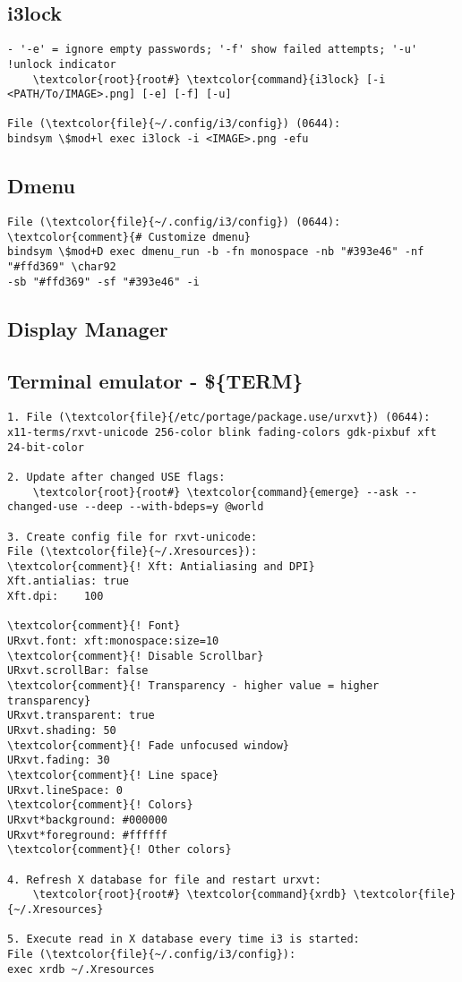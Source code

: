 \documentclass[10pt, a4paper, onecolumn, openany]{book}         %
\begin{document}
\subsection{i3lock}
\begin{Verbatim}[commandchars=\\\{\}]
- '-e' = ignore empty passwords; '-f' show failed attempts; '-u' !unlock indicator
    \textcolor{root}{root#} \textcolor{command}{i3lock} [-i <PATH/To/IMAGE>.png] [-e] [-f] [-u]
    
File (\textcolor{file}{~/.config/i3/config}) (0644):
bindsym \$mod+l exec i3lock -i <IMAGE>.png -efu
\end{Verbatim}



\subsection{Dmenu}
\begin{Verbatim}[commandchars=\\\{\}]
File (\textcolor{file}{~/.config/i3/config}) (0644):
\textcolor{comment}{# Customize dmenu}
bindsym \$mod+D exec dmenu_run -b -fn monospace -nb "#393e46" -nf "#ffd369" \char92
-sb "#ffd369" -sf "#393e46" -i
\end{Verbatim}
\subsection{Display Manager}


\subsection{Terminal emulator - \$\{TERM\}}
\begin{Verbatim}[commandchars=\\\{\}]
1. File (\textcolor{file}{/etc/portage/package.use/urxvt}) (0644):
x11-terms/rxvt-unicode 256-color blink fading-colors gdk-pixbuf xft 24-bit-color

2. Update after changed USE flags:
    \textcolor{root}{root#} \textcolor{command}{emerge} --ask --changed-use --deep --with-bdeps=y @world

3. Create config file for rxvt-unicode:
File (\textcolor{file}{~/.Xresources}):
\textcolor{comment}{! Xft: Antialiasing and DPI}
Xft.antialias: true
Xft.dpi:    100

\textcolor{comment}{! Font}
URxvt.font: xft:monospace:size=10
\textcolor{comment}{! Disable Scrollbar}
URxvt.scrollBar: false
\textcolor{comment}{! Transparency - higher value = higher transparency}
URxvt.transparent: true
URxvt.shading: 50
\textcolor{comment}{! Fade unfocused window}
URxvt.fading: 30
\textcolor{comment}{! Line space}
URxvt.lineSpace: 0
\textcolor{comment}{! Colors}
URxvt*background: #000000
URxvt*foreground: #ffffff
\textcolor{comment}{! Other colors}

4. Refresh X database for file and restart urxvt:
    \textcolor{root}{root#} \textcolor{command}{xrdb} \textcolor{file}{~/.Xresources}
    
5. Execute read in X database every time i3 is started:
File (\textcolor{file}{~/.config/i3/config}):
exec xrdb ~/.Xresources
\end{Verbatim}
\end{document}
